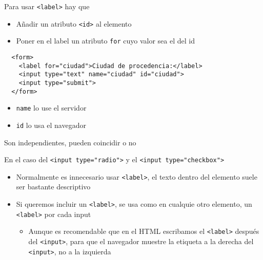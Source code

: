 \documentclass[ucs]{beamer}
\begin{document}
\begin{frame}[fragile]

Para usar
\verb|<label>|
hay que
    \begin{itemize}
    \item
Añadir un atributo
\verb|<id>|
al
elemento

    \item
Poner en el label un atributo
\verb|for|
cuyo valor sea el del id

\end{itemize}

  \begin{scriptsize}
  \begin{verbatim}
  <form>
    <label for="ciudad">Ciudad de procedencia:</label>
    <input type="text" name="ciudad" id="ciudad">
    <input type="submit">
  </form>
  \end{verbatim}
  \end{scriptsize}


    \begin{itemize}
    \item
\verb|name|
lo use el
servidor 
    \item
\verb|id|
lo usa el navegador
    \end{itemize}
Son independientes, pueden coincidir o no


\end{frame}

\begin{frame}[fragile]

En el caso del 
\verb|<input type="radio">|
y el 
\verb|<input type="checkbox">|

    \begin{itemize}
    \item
Normalmente es innecesario usar 
\verb|<label>|,
el texto dentro del elemento suele ser
bastante descriptivo

    \item
Si queremos incluir un 
\verb|<label>|,
 se usa como en cualquie otro elemento,
un 
\verb|<label>|
por cada input

    \begin{itemize}
    \item
 Aunque es recomendable que en el HTML escribamos el 
\verb|<label>|
después del 
\verb|<input>|,
para que el navegador muestre la etiqueta a la derecha del 
\verb|<input>|,
no a la izquierda
    \end{itemize}
    \end{itemize}

\end{frame}
\end{document}
